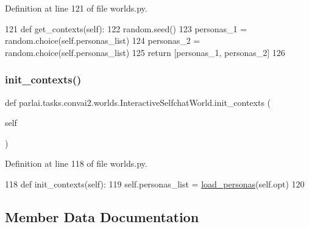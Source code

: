Definition at line 121 of file worlds.\+py.


\begin{DoxyCode}
121     \textcolor{keyword}{def }get\_contexts(self):
122         random.seed()
123         personas\_1 = random.choice(self.personas\_list)
124         personas\_2 = random.choice(self.personas\_list)
125         \textcolor{keywordflow}{return} [personas\_1, personas\_2]
126 \end{DoxyCode}
\mbox{\label{classparlai_1_1tasks_1_1convai2_1_1worlds_1_1InteractiveSelfchatWorld_af7524303845371d515ac5ee27a650ce8}} 
\subsubsection{\texorpdfstring{init\+\_\+contexts()}{init\_contexts()}}
{\footnotesize\ttfamily def parlai.\+tasks.\+convai2.\+worlds.\+Interactive\+Selfchat\+World.\+init\+\_\+contexts (\begin{DoxyParamCaption}\item[{}]{self }\end{DoxyParamCaption})}



Definition at line 118 of file worlds.\+py.


\begin{DoxyCode}
118     \textcolor{keyword}{def }init\_contexts(self):
119         self.personas\_list = \hyperlink{namespaceparlai_1_1tasks_1_1convai2_1_1worlds_a61a758b7cb43183397d002f7f203f586}{load\_personas}(self.opt)
120 
\end{DoxyCode}


\subsection{Member Data Documentation}
\mbox{\label{classparlai_1_1tasks_1_1convai2_1_1worlds_1_1InteractiveSelfchatWorld_aa750cd45fa90b0d961c23e8d25ac5b4a}} 
